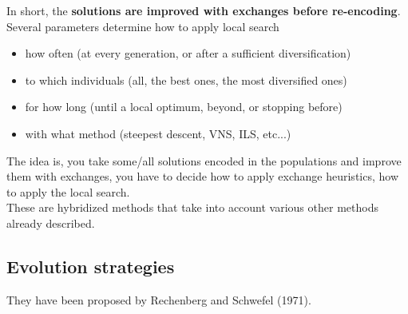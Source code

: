 \documentclass[11pt]{article}
\begin{document}
	In short, the \textbf{solutions are improved with exchanges before re-encoding}.\\
	
	Several parameters determine how to apply local search
	\begin{itemize}
		\item how often (at every generation, or after a sufficient diversification)
		\item to which individuals (all, the best ones, the most diversified ones)
		\item for how long (until a local optimum, beyond, or stopping before)
		\item with what method (steepest descent, VNS, ILS, etc...)
	\end{itemize}
	
	The idea is, you take some/all solutions encoded in the populations and improve them with exchanges, you have to decide how to apply exchange heuristics, how to apply the local search.\\
	These are hybridized methods that take into account various other methods already described.\\
	
	\newpage
	
	\subsection{Evolution strategies}
	They have been proposed by Rechenberg and Schwefel (1971).\\
	
\end{document}
